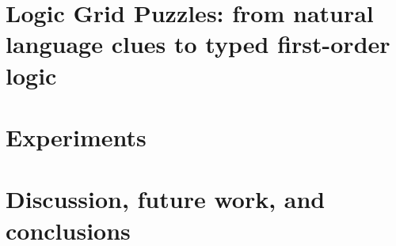 \documentclass{ecai}
\begin{document}
\section{Logic Grid Puzzles: from natural language clues to typed first-order logic}\label{sec:holistic}



\section{Experiments}


\section{Discussion, future work, and conclusions}

\clearpage


\end{document}
